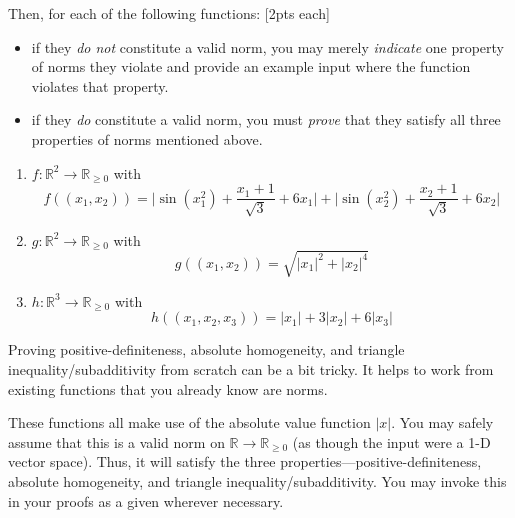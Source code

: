 Then, for each of the following functions: [2pts each]
\begin{itemize}
    \itemsep 0em
    \item if they \textit{do not} constitute a valid norm, you may merely \emph{indicate} one property of norms they violate and provide an example input where the function violates that property.
    \item if they \textit{do} constitute a valid norm, you must \emph{prove} that they satisfy all three properties of norms mentioned above.
\end{itemize}

\begin{enumerate}[label=\alph*.]
    \item $f \colon \mathbb{R}^2 \to \mathbb{R}_{\ge 0}$ with
        $$f((x_1, x_2)) = \biggl|\sin(x_1^2) + \frac{x_1 + 1}{\sqrt{3}} + 6x_1\biggr| + \biggl|\sin(x_2^2) + \frac{x_2 + 1}{\sqrt{3}} + 6x_2\biggr|$$
    \item $g \colon \mathbb{R}^2 \to \mathbb{R}_{\ge 0}$ with
        $$g((x_1, x_2)) = \sqrt{|x_1|^2 + |x_2|^{4}}$$
    \item $h \colon \mathbb{R}^{3} \to \mathbb{R}_{\ge 0}$ with
        $$h((x_1, x_2, x_3)) = |x_1| + 3|x_2| + 6|x_3|$$
\end{enumerate}

\begin{hintbox}
Proving positive-definiteness, absolute homogeneity, and triangle inequality/subadditivity from scratch can be a bit tricky. It helps to work from existing functions that you already know are norms.

\smallskip These functions all make use of the absolute value function $|x|$. You may safely assume that this is a valid norm on $\mathbb{R} \to \mathbb{R}_{\ge 0}$ (as though the input were a 1-D vector space). Thus, it will satisfy the three properties—positive-definiteness, absolute homogeneity, and triangle inequality/subadditivity. You may invoke this in your proofs as a given wherever necessary.
\end{hintbox}
\newpage



